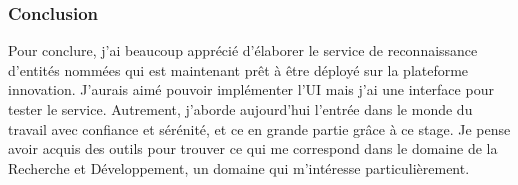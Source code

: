 \subsubsection*{Conclusion}

Pour conclure, j'ai beaucoup apprécié d'élaborer le service de reconnaissance d'entités nommées qui est maintenant prêt à être déployé sur la plateforme innovation. J'aurais aimé pouvoir implémenter l'UI mais j'ai une interface pour tester le service.  Autrement, j'aborde aujourd'hui l'entrée dans le monde du travail avec confiance et sérénité, et ce en grande partie grâce à ce stage. Je pense avoir acquis des outils pour trouver ce qui me correspond dans le domaine de la Recherche et Développement, un domaine qui m'intéresse particulièrement. 

